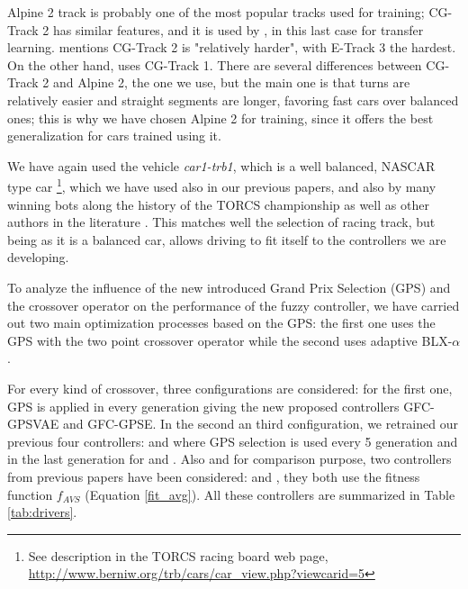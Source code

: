 \documentclass[10pt,journal,compsoc]{IEEEtran}
\begin{document}
Alpine 2 track is probably one of the most popular tracks used for
training; CG-Track 2 has similar features, and it is used by
\cite{mirus2019short,8833873,verma2018programmatically},
in this last case for transfer learning. \cite{Kole-ParamCarTunning12}
mentions CG-Track 2 is "relatively harder", with E-Track 3 the
hardest. On the other hand, \cite{10.1371/journal.pone.0213193} uses
CG-Track 1. There are several differences between CG-Track 2 and Alpine
2, the one we use, but the main one is that turns are relatively
easier and straight segments are longer, favoring fast cars over
balanced ones; this is why we have chosen Alpine 2 for training, since
it offers the best generalization for cars trained using it.

We have again used the vehicle \textit{car1-trb1},
which is a well balanced, NASCAR type car \footnote{See description in
  the TORCS racing board web page,
  \url{http://www.berniw.org/trb/cars/car_view.php?viewcarid=5}},
which we have used also in our previous papers, and also by many
winning bots along the history of the TORCS championship
\cite{torcs5} as well as other authors in the literature
\cite{auteur2010,li2019reinforcement}. This matches well the selection
of racing track, but being as it is a balanced car, allows driving to
fit itself to the controllers we are developing.



To analyze the influence of the new introduced Grand Prix Selection
(GPS) and the crossover operator on the performance of the fuzzy
controller, we have carried out  two main optimization processes based
on the GPS: the first one uses the GPS with the two point crossover
operator while the second uses adaptive BLX-$\alpha$.

For every kind of crossover, three configurations are considered: for
the first one, GPS is applied in every generation giving the new
proposed controllers {\sf GFC-GPSVAE} and {\sf GFC-GPSE}. 
In the second an third configuration, we retrained our previous four  controllers\cite{DBLP:conf/cig/SalemMG19}: {} and 
{} where GPS selection is used every 5 generation and in the last generation for  {} and {}.
Also and for comparison purpose, two controllers from previous papers have been considered: {}\cite{DBLP:conf/cig/SalemMG19} and {}\cite{salem_cig2018}, they both use the fitness function $f_{AVS}$ (Equation \ref{fit_avg}).
All these controllers are summarized in Table \ref{tab:drivers}. 
\end{document}

